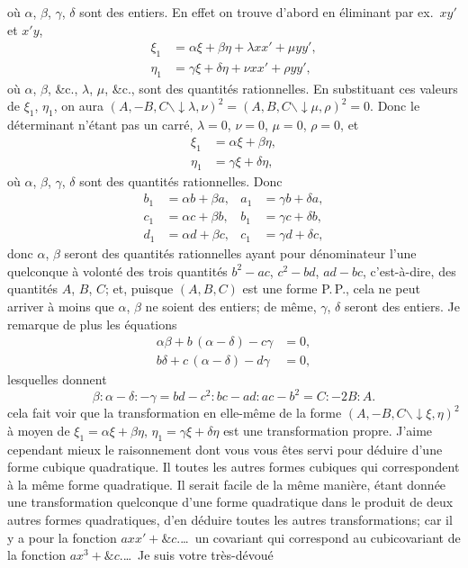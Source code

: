 \documentclass[11pt]{article}
\begin{document}
\noindent o\`u $\alpha$, $\beta$, $\gamma$, $\delta$ sont des entiers. En effet on trouve d'abord en \'eliminant par ex.\ $xy'$
et $x'y$,
\begin{align*}
\xi_{1} &= \alpha\xi + \beta\eta + \lambda xx' + \mu yy',\\
\eta_{1} &= \gamma\xi + \delta\eta + \nu xx' + \rho yy',
\end{align*}
o\`u $\alpha$, $\beta$, \&c., $\lambda$, $\mu$, \&c., sont des quantit\'es rationnelles. En substituant ces valeurs de
$\xi_{1}$, $\eta_{1}$, on aura $(A, -B, C \mathbin{\backslash\!\!\!\downarrow} \lambda, \nu)^{2} = (A, B, C \mathbin{\backslash\!\!\!\downarrow} \mu, \rho)^{2} = 0$. Donc le d\'eterminant
n'\'etant pas un carr\'e, $\lambda = 0$, $\nu = 0$, $\mu = 0$, $\rho = 0$, et
\begin{align*}
\xi_{1} &= \alpha\xi + \beta\eta,\\
\eta_{1} &= \gamma\xi + \delta\eta,
\end{align*}
o\`u $\alpha$, $\beta$, $\gamma$, $\delta$ sont des quantit\'es rationnelles. Donc
\begin{align*}
b_{1} &= \alpha b + \beta a, & a_{1} &= \gamma b + \delta a,\\
c_{1} &= \alpha c + \beta b, & b_{1} &= \gamma c + \delta b,\\
d_{1} &= \alpha d + \beta c, & c_{1} &= \gamma d + \delta c,
\end{align*}
donc $\alpha$, $\beta$ seront des quantit\'es rationnelles ayant pour d\'enominateur l'une quelconque
\`a volont\'e des trois quantit\'es $b^{2} - ac$, $c^{2} - bd$, $ad - bc$, c'est-\`a-dire, des quantit\'es $A$, $B$, $C$;
et, puisque $(A, B, C)$ est une forme P.\,P., cela ne peut arriver \`a moins que $\alpha$, $\beta$ ne
soient des entiers; de m\^eme, $\gamma$, $\delta$ seront des entiers. Je remarque de plus les
\'equations
\begin{align*}
\alpha\beta + b\,(\alpha - \delta) - c\gamma &= 0,\\
b\delta + c\,(\alpha - \delta) - d\gamma &= 0,
\end{align*}
lesquelles donnent
\[
\beta : \alpha - \delta : -\gamma = bd - c^{2} : bc - ad : ac - b^{2} = C : -2B : A.
\]
cela fait voir que la transformation en elle-m\^eme de la forme $(A, -B, C \mathbin{\backslash\!\!\!\downarrow} \xi, \eta)^{2}$ \`a
moyen de $\xi_{1} = \alpha\xi + \beta\eta$, $\eta_{1} = \gamma\xi + \delta\eta$ est une transformation propre. J'aime cependant
mieux le raisonnement dont vous vous \^etes servi pour d\'eduire d'une forme cubique quadratique. Il
toutes les autres formes cubiques qui correspondent \`a la m\^eme forme quadratique. Il
serait facile de la m\^eme mani\`ere, \'etant donn\'ee une transformation quelconque d'une
forme quadratique dans le produit de deux autres formes quadratiques, d'en d\'eduire toutes
les autres transformations; car il y a pour la fonction $axx' + \&c.$\ldots\ un covariant qui
correspond au cubicovariant de la fonction $ax^{3} + \&c.$\ldots\ Je suis votre tr\`es-d\'evou\'e
\end{document}
